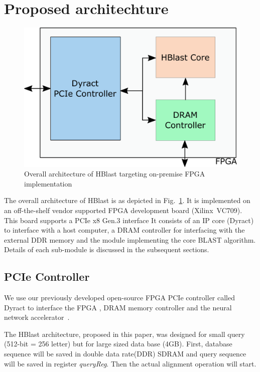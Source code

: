 \section{Proposed architechture}
\label{sec:propesedArch}

\begin{figure}[h!]
\centering
\includegraphics[width=\columnwidth]{Figures/sysArch.pdf}
\caption{Overall architecture of HBlast targeting on-premise FPGA implementation} \label{fig:sysArch}
\end{figure}

The overall architecture of HBlast is as depicted in Fig.~\ref{fig:sysArch}.
It is implemented on an off-the-shelf vendor supported FPGA development board (Xilinx~VC709).
This board supports a PCIe x8 Gen.3 interface
It consists of an IP core (Dyract) to interface with a host computer, a DRAM controller for interfacing with the external DDR memory and the module implementing the core BLAST algorithm.
Details of each sub-module is discussed in the subsequent sections.

\subsection{PCIe Controller}
We use our previously developed open-source FPGA PCIe controller called Dyract to interface the FPGA , DRAM memory controller and the neural network accelerator~\cite{blanked}.



\quad The HBlast architecture, proposed in this paper, was designed for small query (512-bit = 256 letter) but for large sized data base (4GB).  First, database sequence will be saved in double data rate(DDR) SDRAM and query sequence will be saved in register \textit{queryReg}. Then the actual alignment operation will start. 
   
